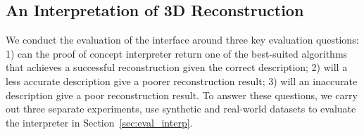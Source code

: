 \subsection{An Interpretation of 3D Reconstruction}
We conduct the evaluation of the interface around three key evaluation questions: 1) can the proof of concept interpreter return one of the best-suited algorithms that achieves a successful reconstruction given the correct description; 2) will a less accurate description give a poorer reconstruction result; 3) will an inaccurate description give a poor reconstruction result. To answer these questions, we carry out three separate experiments, use synthetic and real-world datasets to evaluate the interpreter in Section~\ref{sec:eval_interp}.



